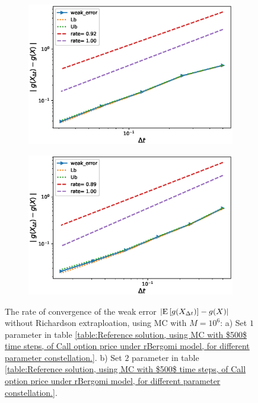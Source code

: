 \FloatBarrier
\begin{figure}[h!]
	\centering
	\begin{subfigure}{.35\textwidth}
		\centering
		\includegraphics[width=1\linewidth]{./figures/rBergomi_weak_error_rates/without_richardson/H_043/weak_convergence_order_Bergomi_H_043_K_1_M_10_6_CI_relative}
		\caption{}
		\label{fig:sub3}
	\end{subfigure}%
	\begin{subfigure}{.35\textwidth}
		\centering
		\includegraphics[width=1\linewidth]{./figures/rBergomi_weak_error_rates/without_richardson/H_007/weak_convergence_order_Bergomi_H_007_K_1_M_10_6_CI_relative}
		\caption{}
		\label{fig:sub4}
	\end{subfigure}
	
	\caption{The rate of convergence of the weak error  $\left\lvert\mathrm{E}\left[g(X_{\Delta t})\right]-g(X)\right\rvert$  without Richardson extraploation, using MC with $M=10^6$: a) Set $1$ parameter in table \ref{table:Reference solution, using MC with $500$ time steps, of Call option price under rBergomi model, for different parameter constellation.}.  b) Set $2$ parameter in table \ref{table:Reference solution, using MC with $500$ time steps, of Call option price under rBergomi model, for different parameter constellation.}.}
	\label{fig:Weak_rate_set1_set_2_without_rich}
\end{figure}



